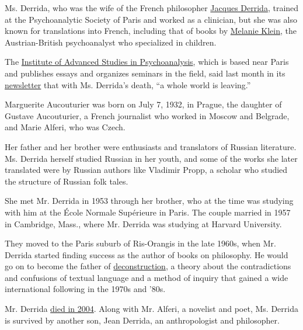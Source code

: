 Ms. Derrida, who was the wife of the French philosopher
\href{https://www.nytimes.com/1994/01/23/magazine/jacques-derrida.html?searchResultPosition=1}{Jacques
Derrida}, trained at the Psychoanalytic Society of Paris and worked as a
clinician, but she was also known for translations into French,
including that of books by
\href{https://www.nytimes.com/1960/09/23/archives/melanie-klein-is-dead-at-78-child-psychologist-in-britain-special.html?searchResultPosition=2}{Melanie
Klein}, the Austrian-British psychoanalyst who specialized in children.

The \href{http://psychanalyse.ihep.fr/}{Institute of Advanced Studies in
Psychoanalysis}, which is based near Paris and publishes essays and
organizes seminars in the field, said last month in its
\href{https://mailchi.mp/c133515b4808/la-lettre-de-lihep-21-mars-2020?fbclid=IwAR2pFA1Xe7iBcx2Os8u7HT5rAp5OK5QyiYLnhqSmCWCc1Ou8UPUOgnywrH8}{newsletter}
that with Ms. Derrida's death, ``a whole world is leaving.''

Marguerite Aucouturier was born on July 7, 1932, in Prague, the daughter
of Gustave Aucouturier, a French journalist who worked in Moscow and
Belgrade, and Marie Alferi, who was Czech.

Her father and her brother were enthusiasts and translators of Russian
literature. Ms. Derrida herself studied Russian in her youth, and some
of the works she later translated were by Russian authors like Vladimir
Propp, a scholar who studied the structure of Russian folk tales.

She met Mr. Derrida in 1953 through her brother, who at the time was
studying with him at the École Normale Supérieure in Paris. The couple
married in 1957 in Cambridge, Mass., where Mr. Derrida was studying at
Harvard University.

They moved to the Paris suburb of Ris-Orangis in the late 1960s, when
Mr. Derrida started finding success as the author of books on
philosophy. He would go on to become the father of
\href{https://www.britannica.com/topic/deconstruction}{deconstruction},
a theory about the contradictions and confusions of textual language and
a method of inquiry that gained a wide international following in the
1970s and '80s.

Mr. Derrida
\href{https://www.nytimes.com/2004/10/10/obituaries/jacques-derrida-abstruse-theorist-dies-at-74.html}{died
in 2004}. Along with Mr. Alferi, a novelist and poet, Ms. Derrida is
survived by another son, Jean Derrida, an anthropologist and
philosopher.

